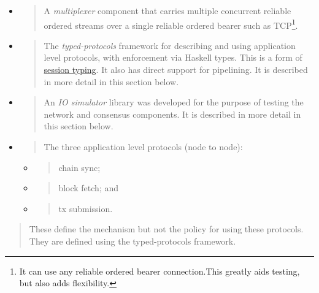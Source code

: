 \documentclass[]{article}
\begin{document}
\begin{itemize}
\item
  \begin{quote}
  A \emph{multiplexer} component that carries multiple concurrent
  reliable ordered streams over a single reliable ordered bearer such as
  TCP\footnote{It can use any reliable ordered bearer connection.This
    greatly aids testing, but also adds flexibility.}.
  \end{quote}
\item
  \begin{quote}
  The \emph{typed-protocols} framework for describing and using
  application level protocols, with enforcement via Haskell types. This
  is a form of \href{https://groups.inf.ed.ac.uk/abcd/}{{session
  typing}}. It also has direct support for pipelining. It is described
  in more detail in this section below.
  \end{quote}
\item
  \begin{quote}
  An \emph{IO simulator} library was developed for the purpose of
  testing the network and consensus components. It is described in more
  detail in this section below.
  \end{quote}
\item
  \begin{quote}
  The three application level protocols (node to node):
  \end{quote}

  \begin{itemize}
  \item
    \begin{quote}
    chain sync;
    \end{quote}
  \item
    \begin{quote}
    block fetch; and
    \end{quote}
  \item
    \begin{quote}
    tx submission.
    \end{quote}
  \end{itemize}
\end{itemize}

\begin{quote}
These define the mechanism but not the policy for using these protocols.
They are defined using the typed-protocols framework.
\end{quote}
\end{document}
